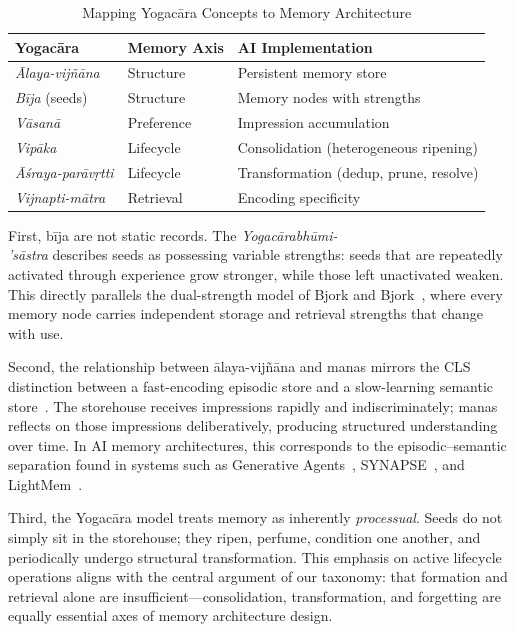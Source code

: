 \begin{table}[t]
\centering
\caption{Mapping Yogac\=ara Concepts to Memory Architecture}
\label{tab:yogacara-mapping}
\begin{tabular}{@{}L{2.2cm}L{2.2cm}L{3cm}@{}}
\toprule
\textbf{Yogac\=ara} & \textbf{Memory Axis} & \textbf{AI Implementation} \\
\midrule
\emph{\=Alaya-vij\~n\=ana} & Structure & Persistent memory store \\
\emph{B\=ija} (seeds) & Structure & Memory nodes with strengths \\
\emph{V\=asan\=a} & Preference & Impression accumulation \\
\emph{Vip\=aka} & Lifecycle & Consolidation (heterogeneous ripening) \\
\emph{\=A\'sraya-par\=av\d{r}tti} & Lifecycle & Transformation (dedup, prune, resolve) \\
\emph{Vijnapti-m\=atra} & Retrieval & Encoding specificity \\
\bottomrule
\end{tabular}
\end{table}

First, b\=ija are not static records.  The
\emph{Yogac\=arabh\=umi-\\'s\=astra} describes seeds as possessing
variable strengths: seeds that are repeatedly activated through
experience grow stronger, while those left unactivated weaken.  This
directly parallels the dual-strength model of Bjork and
Bjork~\cite{bjork1992}, where every memory node carries independent
storage and retrieval strengths that change with use.

Second, the relationship between \=alaya-vij\~n\=ana and manas mirrors
the CLS distinction between a fast-encoding episodic store and a
slow-learning semantic store~\cite{mcclelland1995}.  The storehouse
receives impressions rapidly and indiscriminately; manas reflects on
those impressions deliberatively, producing structured understanding
over time.  In AI memory architectures, this corresponds to the
episodic--semantic separation found in systems such as Generative
Agents~\cite{park2023generative}, SYNAPSE~\cite{jiang2026synapse}, and
LightMem~\cite{fang2025lightmem}.

Third, the Yogac\=ara model treats memory as inherently
\emph{processual}.  Seeds do not simply sit in the storehouse; they
ripen, perfume, condition one another, and periodically undergo
structural transformation.  This emphasis on active lifecycle operations
aligns with the central argument of our taxonomy: that formation and
retrieval alone are insufficient---consolidation, transformation, and
forgetting are equally essential axes of memory architecture design.

